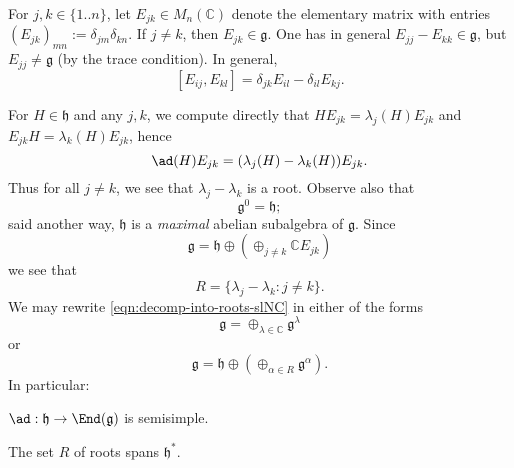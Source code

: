 \documentclass[reqno]{amsart} 
\begin{document}
For $j,k \in \{1..n\}$, let $E_{j k} \in M_n(\mathbb{C})$ denote the elementary matrix with entries $(E_{j k})_{m n} := \delta_{j m} \delta_{k n}$.  If $j \neq k$, then $E_{j k} \in \mathfrak{g}$.  One has in general $E_{j j} - E_{k k} \in \mathfrak{g}$, but $E_{j j} \neq \mathfrak{g}$ (by the trace condition).  In general,
\begin{equation}\label{eq:commutators-of-elementary-matrices}
 [E_{i j}, E_{k l}]
  = \delta_{j k} E_{i l}
  - \delta_{i l} E_{k j}.
\end{equation}

For $H \in \mathfrak{h}$ and any $j,k$, we compute directly that $H E_{j k} = \lambda_j(H) E_{j k}$ and $E_{j k} H = \lambda_k(H) E_{j k}$, hence
\begin{equation}
  \ad(H) E_{j k}
  = (\lambda_j(H) - \lambda_k(H)) E_{j k}.
\end{equation}
Thus for all $j \neq k$, we see that $\lambda_j - \lambda_k$ is a root.  Observe also that
\begin{equation}\label{eq:h-self-centralizing-slN}
  \mathfrak{g}^0 = \mathfrak{h};
\end{equation}
said another way, $\mathfrak{h}$ is a \emph{maximal} abelian subalgebra of $\mathfrak{g}$.  Since
\begin{equation}\label{eqn:decomp-into-roots-slNC}
  \mathfrak{g} = \mathfrak{h} \oplus (\oplus_{j \neq k}
  \mathbb{C} E_{j k})
\end{equation}
we see that
\begin{equation}\label{eq:roots-of-slN}
  R = \{\lambda_j - \lambda_k : j \neq k\}.
\end{equation}
We may rewrite \eqref{eqn:decomp-into-roots-slNC} in either of the forms
\begin{equation}\label{eqn:decomp-into-roots-slNC-2}
  \mathfrak{g} = \oplus_{\lambda \in \mathbb{C}}
  \mathfrak{g}^\lambda
\end{equation}
or
\begin{equation}\label{eqn:decomp-into-roots-slNC-3}
  \mathfrak{g} = \mathfrak{h} \oplus (\oplus_{\alpha \in R}
  \mathfrak{g}^\alpha).
\end{equation}
In particular:
\begin{lemma}\label{lem:adjoint-action-cartan-slNC-is-semisimple}
  $\ad : \mathfrak{h} \rightarrow \End(\mathfrak{g})$ is semisimple.
\end{lemma}
\begin{lemma}\label{lem:roots-span}
  The set $R$ of roots spans $\mathfrak{h}^*$.
\end{lemma}
\end{document}
